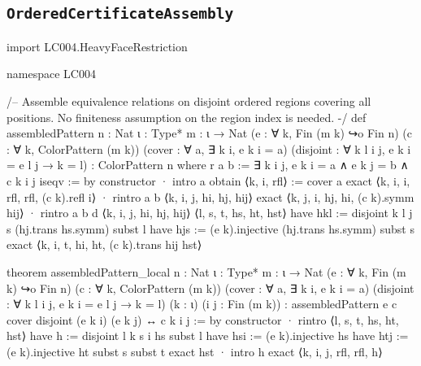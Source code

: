 \documentclass[11pt,reqno]{amsart}
\theoremstyle{definition}
\begin{document}
\subsection{\texorpdfstring{\texttt{OrderedCertificateAssembly}}{OrderedCertificateAssembly}}
\begin{LeanCode}
import LC004.HeavyFaceRestriction

namespace LC004

/-- Assemble equivalence relations on disjoint ordered regions covering all
positions. No finiteness assumption on the region index is needed. -/
def assembledPattern {n : Nat} {ι : Type*} {m : ι → Nat}
    (e : ∀ k, Fin (m k) ↪o Fin n) (c : ∀ k, ColorPattern (m k))
    (cover : ∀ a, ∃ k i, e k i = a)
    (disjoint : ∀ k l i j, e k i = e l j → k = l) : ColorPattern n where
  r a b := ∃ k i j, e k i = a ∧ e k j = b ∧ c k i j
  iseqv := by
    constructor
    · intro a
      obtain ⟨k, i, rfl⟩ := cover a
      exact ⟨k, i, i, rfl, rfl, (c k).refl i⟩
    · rintro a b ⟨k, i, j, hi, hj, hij⟩
      exact ⟨k, j, i, hj, hi, (c k).symm hij⟩
    · rintro a b d ⟨k, i, j, hi, hj, hij⟩ ⟨l, s, t, hs, ht, hst⟩
      have hkl := disjoint k l j s (hj.trans hs.symm)
      subst l
      have hjs := (e k).injective (hj.trans hs.symm)
      subst s
      exact ⟨k, i, t, hi, ht, (c k).trans hij hst⟩

theorem assembledPattern_local {n : Nat} {ι : Type*} {m : ι → Nat}
    (e : ∀ k, Fin (m k) ↪o Fin n) (c : ∀ k, ColorPattern (m k))
    (cover : ∀ a, ∃ k i, e k i = a)
    (disjoint : ∀ k l i j, e k i = e l j → k = l)
    (k : ι) (i j : Fin (m k)) :
    assembledPattern e c cover disjoint (e k i) (e k j) ↔ c k i j := by
  constructor
  · rintro ⟨l, s, t, hs, ht, hst⟩
    have h := disjoint l k s i hs
    subst l
    have hsi := (e k).injective hs
    have htj := (e k).injective ht
    subst s
    subst t
    exact hst
  · intro h
    exact ⟨k, i, j, rfl, rfl, h⟩


\end{LeanCode}
\end{document}
